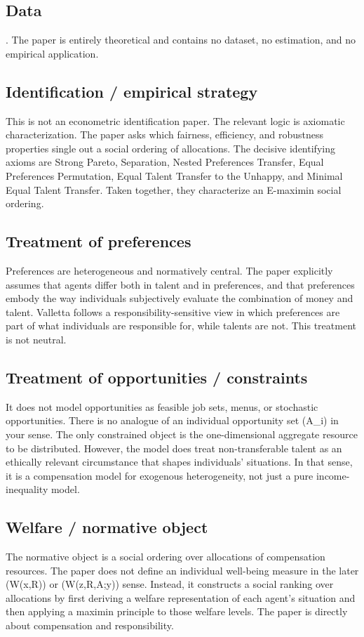 \documentclass[11pt,a4paper]{article}
\begin{document}
\subsection*{Data}
. The paper is entirely theoretical and contains no dataset, no estimation, and no empirical application.

\subsection*{Identification / empirical strategy}
This is not an econometric identification paper. The relevant logic is axiomatic characterization. The paper asks which fairness, efficiency, and robustness properties single out a social ordering of allocations. The decisive identifying axioms are Strong Pareto, Separation, Nested Preferences Transfer, Equal Preferences Permutation, Equal Talent Transfer to the Unhappy, and Minimal Equal Talent Transfer. Taken together, they characterize an E-maximin social ordering.

\subsection*{Treatment of preferences}
Preferences are heterogeneous and normatively central. The paper explicitly assumes that agents differ both in talent and in preferences, and that preferences embody the way individuals subjectively evaluate the combination of money and talent. Valletta follows a responsibility-sensitive view in which preferences are part of what individuals are responsible for, while talents are not. This treatment is not neutral.

\subsection*{Treatment of opportunities / constraints}
It does not model opportunities as feasible job sets, menus, or stochastic opportunities. There is no analogue of an individual opportunity set (A\_i) in your sense. The only constrained object is the one-dimensional aggregate resource to be distributed. However, the model does treat non-transferable talent as an ethically relevant circumstance that shapes individuals’ situations. In that sense, it is a compensation model for exogenous heterogeneity, not just a pure income-inequality model.

\subsection*{Welfare / normative object}
The normative object is a social ordering over allocations of compensation resources. The paper does not define an individual well-being measure in the later (W(x,R)) or (W(z,R,A;y)) sense. Instead, it constructs a social ranking over allocations by first deriving a welfare representation of each agent’s situation and then applying a maximin principle to those welfare levels. The paper is directly about compensation and responsibility.
\end{document}
